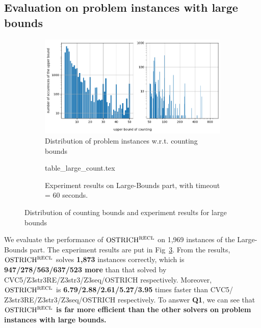 \subsection{Evaluation on problem instances with large bounds}\label{subsec:large_bounds_eval}
%
\begin{figure}[ht]
  \centering
  \begin{subfigure}[t]{0.49\textwidth}
    \centering\vskip 0pt
    \includegraphics[width=1\textwidth]{counting_distribution.png}  
    \caption{Distribution of problem instances w.r.t. counting bounds}  
    \label{fig:count_distri}
  \end{subfigure}
  \hfill
  \begin{subfigure}[t]{0.49\textwidth}
    \centering\vskip 0pt
    {table_large_count.tex}
    \caption{Experiment results on Large-Bounds part, with timeout = 60 seconds.}
    \label{fig:table_large_count}
  \end{subfigure}
  \caption{Distribution of counting bounds and experiment results for large bounds}
\end{figure}

We evaluate the performance of $\rm OSTRICH^{RECL}$ on 1,969 instances of the Large-Bounds part. 
The experiment results are put in Fig~\ref{fig:table_large_count}. From the results, $\rm OSTRICH^{RECL}$ solves \textbf{1,873} instances correctly, which is \textbf{947/278/563/637/523 more} than that solved by CVC5/Z3str3RE/Z3str3/Z3seq/OSTRICH respectively. Moreover, $\rm OSTRICH^{RECL}$ is \textbf{ 6.79/2.88/2.61/5.27/3.95} times faster than CVC5/ Z3str3RE/Z3str3/Z3seq/OSTRICH respectively. To answer \textbf{Q1}, we can see that $\rm OSTRICH^{RECL}$ \textbf{is far more efficient than the other solvers on problem instances with large bounds.}

